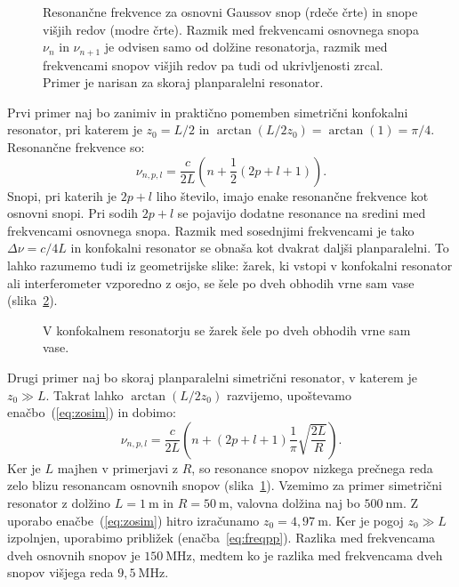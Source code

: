 \begin{figure}[ht]
\centering
\def\svgwidth{110truemm} 

\caption{Resonančne frekvence za osnovni Gaussov snop (rdeče črte) in snope višjih redov
(modre črte). Razmik med frekvencami osnovnega snopa $\nu_n$ in $\nu_{n+1}$ je odvisen 
samo od dolžine resonatorja, razmik med frekvencami snopov višjih redov pa tudi od 
ukrivljenosti zrcal. Primer je narisan za skoraj planparalelni resonator.}
\label{fig:crte}
\end{figure}
Prvi primer naj bo zanimiv in praktično pomemben simetrični konfokalni 
resonator, pri katerem je $z_{0}=L/2$ in 
$\arctan(L/2z_{0})= \arctan(1)=\pi/4$. Resonančne frekvence so:
\begin{equation}
\nu_{n,p,l}=\frac{c}{2L}\left(n+\frac{1}{2}(2p+l+1)\right)\!\!.
\label{eq:omega_konf}
\end{equation}
Snopi, pri katerih je $2p+l$ liho število, imajo enake resonančne frekvence kot
osnovni snopi. Pri sodih $2p+l$ se pojavijo dodatne resonance na sredini
med frekvencami osnovnega snopa. Razmik med so\-sed\-nji\-mi frekvencami je tako $\Delta\nu=c/4L$
in konfokalni resonator se obnaša kot dvakrat daljši planparalelni.
To lahko razumemo tudi iz geometrijske slike: žarek, ki vstopi v konfokalni
resonator ali interferometer vzporedno z osjo, se šele po dveh obhodih vrne sam
vase (slika~\ref{fig:Konfokalni_zarek}).
\begin{figure}[ht]
\centering
\def\svgwidth{55truemm} 

\caption{V konfokalnem resonatorju se žarek šele po dveh obhodih
vrne sam vase.}
\label{fig:Konfokalni_zarek}
\end{figure}

Drugi primer naj bo skoraj planparalelni 
simetrični resonator, v katerem je $z_{0}\gg L$. Takrat lahko $\arctan(L/2z_{0})$ razvijemo, 
upoštevamo enačbo~(\ref{eq:zosim}) in dobimo:
\begin{equation}
\nu_{n,p,l}=\frac{c}{2L}\left(n+(2p+l+1)\frac{1}{\pi}\sqrt{\frac{2L}{R}}\right)\!\!.
\label{eq:freqpp}
\end{equation}
Ker je $L$ majhen v primerjavi z $R$, so resonance snopov nizkega prečnega reda 
zelo blizu resonancam osnovnih snopov (slika~\ref{fig:crte}). 
Vzemimo za primer  
simetrični resonator z dolžino $L=1~\si{\metre}$ in $R=50~\si{\metre}$, 
valovna dolžina naj bo $500~\si{\nano\metre}$. Z uporabo enačbe~(\ref{eq:zosim})
hitro izračunamo $z_0 = 4,97~\si{\metre}$. Ker je pogoj $z_0\gg L$ izpolnjen,  uporabimo
približek (enačba~\ref{eq:freqpp}). Razlika med frekvencama dveh osnovnih snopov je 
$150~\si{\mega\hertz}$, medtem ko je razlika med frekvencama dveh snopov višjega reda
$9,5~\si{\mega\hertz}$.

